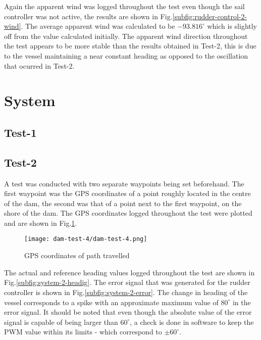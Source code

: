Again the apparent wind was logged throughout the test even though the sail 
controller was not active, the results are shown in Fig.\ref{subfig:rudder-control-2-wind}. The average apparent wind was calculated to be $-93.816^{\circ}$ which is slightly off from the value 
calculated initially. The apparent wind direction throughout the test appears to be more stable than the results obtained in Test-2, this is due to the vessel maintaining a near constant heading
as opposed to the oscillation that ocurred in Test-2.

\section{System}

\subsection{Test-1}
\label{test-1}

\subsection{Test-2}
\label{test-2}
A test was conducted with two separate waypoints being set beforehand. The first waypoint was the GPS coordinates of a point roughly located in the centre of the dam, the second was that
of a point next to the first waypoint, on the shore of the dam. The GPS coordinates logged throughout the test were plotted and are shown in Fig.\ref{fig:system-test-2-path}.

\begin{figure}[h!]
    \centering
    \texttt{[image: dam-test-4/dam-test-4.png]}
    \caption[Path travelled in first rudder control test]{GPS coordinates of path travelled}
    \label{fig:system-test-2-path}
\end{figure}

The actual and reference heading values logged throughout the test are shown in Fig.\ref{subfig:system-2-headig}. The error signal that was generated for the rudder controller is shown in 
Fig.\ref{subfig:system-2-error}. The change in heading of the vessel corresponds to a spike with an approximate maximum value of $80^{\circ}$ in the error signal. It should be noted that 
even though the absolute value of the error signal is capable of being larger than $60^{\circ}$, a check is done in software to keep the PWM value within its limits - which correspond to 
$\pm 60^{\circ}$. 

